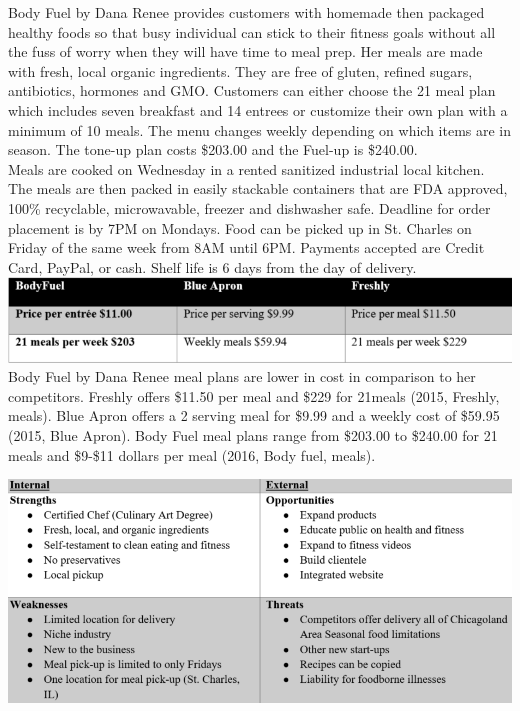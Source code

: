 \documentclass[letterpaper,11pt,2p]{elsarticle}
\begin{document}
Body Fuel by Dana Renee provides customers with homemade then packaged healthy foods so that busy individual can stick to their fitness goals without all the fuss of worry when they will have time to meal prep. Her meals are made with fresh, local organic ingredients. They are free of gluten, refined sugars, antibiotics, hormones and GMO.  Customers can either choose the 21 meal plan which includes seven breakfast and 14 entrees or customize their own plan with a minimum of 10 meals. The menu changes weekly depending on which items are in season.  The tone-up plan costs \$203.00 and the Fuel-up is \$240.00. \\

Meals are cooked on Wednesday in a rented sanitized industrial local kitchen. The meals are then packed in easily stackable containers that are FDA approved, 100\% recyclable, microwavable, freezer and dishwasher safe.  Deadline for order placement is by 7PM on Mondays.  Food can be picked up in St. Charles on Friday of the same week from 8AM until 6PM. Payments accepted are Credit Card, PayPal, or cash. Shelf life is 6 days from the day of delivery.\\


\includegraphics[scale=0.9]{Compare}\\


Body Fuel by Dana Renee meal plans are lower in cost in comparison to her competitors.  Freshly offers \$11.50 per meal and \$229 for 21meals (2015, Freshly, meals). Blue Apron offers a 2 serving meal for \$9.99 and a weekly cost of \$59.95 (2015, Blue Apron). Body Fuel meal plans range from \$203.00 to \$240.00 for 21 meals and \$9-\$11 dollars per meal (2016, Body fuel, meals).

\begin{center}
\includegraphics[scale=0.6]{SWOT}\\
\end{center}
\end{document}
